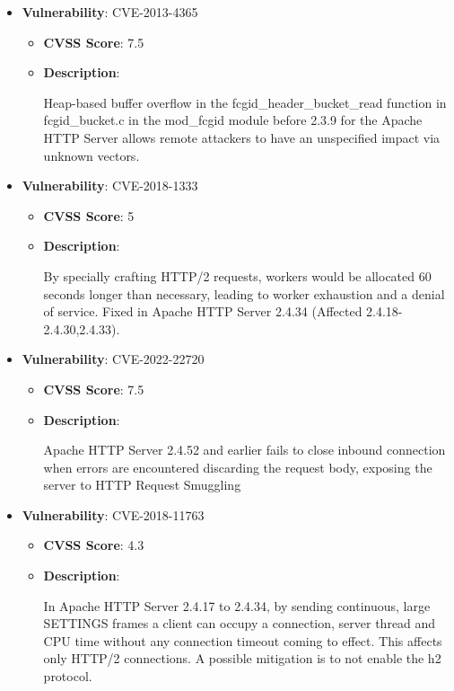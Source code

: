 \documentclass{article}
\begin{document}
\begin{itemize}
        \item \textbf{Vulnerability}: CVE-2013-4365
        \begin{itemize}
            \item \textbf{CVSS Score}:  7.5 
            \item \textbf{Description}:
            \parbox[t]{0.9\linewidth}{
                \ttfamily Heap-based buffer overflow in the fcgid\_header\_bucket\_read function in fcgid\_bucket.c in the mod\_fcgid module before 2.3.9 for the Apache HTTP Server allows remote attackers to have an unspecified impact via unknown vectors.
            }
        \end{itemize}
    
        \item \textbf{Vulnerability}: CVE-2018-1333
        \begin{itemize}
            \item \textbf{CVSS Score}:  5 
            \item \textbf{Description}:
            \parbox[t]{0.9\linewidth}{
                \ttfamily By specially crafting HTTP/2 requests, workers would be allocated 60 seconds longer than necessary, leading to worker exhaustion and a denial of service. Fixed in Apache HTTP Server 2.4.34 (Affected 2.4.18-2.4.30,2.4.33).
            }
        \end{itemize}
    
        \item \textbf{Vulnerability}: CVE-2022-22720
        \begin{itemize}
            \item \textbf{CVSS Score}:  7.5 
            \item \textbf{Description}:
            \parbox[t]{0.9\linewidth}{
                \ttfamily Apache HTTP Server 2.4.52 and earlier fails to close inbound connection when errors are encountered discarding the request body, exposing the server to HTTP Request Smuggling
            }
        \end{itemize}
    
        \item \textbf{Vulnerability}: CVE-2018-11763
        \begin{itemize}
            \item \textbf{CVSS Score}:  4.3 
            \item \textbf{Description}:
            \parbox[t]{0.9\linewidth}{
                \ttfamily In Apache HTTP Server 2.4.17 to 2.4.34, by sending continuous, large SETTINGS frames a client can occupy a connection, server thread and CPU time without any connection timeout coming to effect. This affects only HTTP/2 connections. A possible mitigation is to not enable the h2 protocol.
            }
        \end{itemize}
    

\end{itemize}
\end{document}
